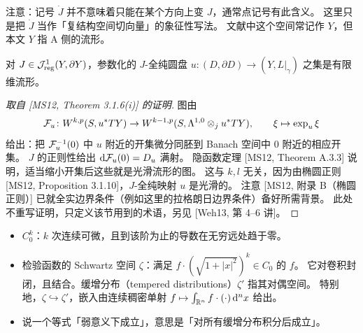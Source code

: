 \begin{remark}[记号]\label{c7:rem-notation-Jdot}
注意：记号 $\dot J$ 并不意味着只能在某个方向上变 $J$，通常点记号有此含义。
这里只是把 $\dot J$ 当作「复结构空间切向量」的象征性写法。
文献中这个空间常记作 $Y$，但本文 $Y$ 指 A 侧的流形。
\end{remark}

\begin{lemma}\label{c7:lem-param-discs}
对 $J\in\mathcal{J}^1_{\mathrm{reg}}(Y,\partial Y)$，参数化的 $J$-全纯圆盘 $u\colon(D,\partial D)\to(Y,L|_\gamma)$ 之集是有限维流形。
\end{lemma}

\begin{proof}[{取自 [MS12, Theorem 3.1.6(i)] 的证明}]
图由
\[
\mathcal{F}_u\colon W^{k,p}(S,u^*TY)\to W^{k-1,p}(S,\Lambda^{1,0}\otimes_j u^*TY),
\qquad
\xi\mapsto\exp_u\xi
\]
给出：把 $\mathcal{F}_u^{-1}(0)$ 中 $u$ 附近的开集微分同胚到 Banach 空间中 $0$ 附近的相应开集。
$J$ 的正则性给出 $\mathrm{d}\mathcal{F}_u(0)=D_u$ 满射。
隐函数定理 [MS12, Theorem A.3.3] 说明，适当缩小开集后这些就是光滑流形的图。
这与 $k,l$ 无关，因为由椭圆正则 [MS12, Proposition 3.1.10]，$J$-全纯映射 $u$ 是光滑的。
注意 [MS12, 附录 B（椭圆正则）] 已就全实边界条件（例如这里的拉格朗日边界条件）备好所需背景。
此处不重写证明，只定义该节用到的术语，另见 [Weh13, 第 4--6 讲]。
\end{proof}

\begin{itemize}[leftmargin=1.6em,itemsep=0.2em]
\item $C^k_0$：$k$ 次连续可微，且到该阶为止的导数在无穷远处趋于零。
\item 检验函数的 Schwartz 空间 $\zeta$：满足 $f\cdot(\sqrt{1+|x|^2})^k\in C_0$ 的 $f$。
      它对卷积封闭，且结合。缓增分布（tempered distributions）$\zeta'$ 指其对偶空间。
      特别地，$\zeta\hookrightarrow\zeta'$，嵌入由连续稠密单射 $f\mapsto\int_{\mathbb{R}^n}f\cdot(\cdot)\,\mathrm{d}^nx$ 给出。
\item 说一个等式「弱意义下成立」，意思是「对所有缓增分布积分后成立」。
\end{itemize}


